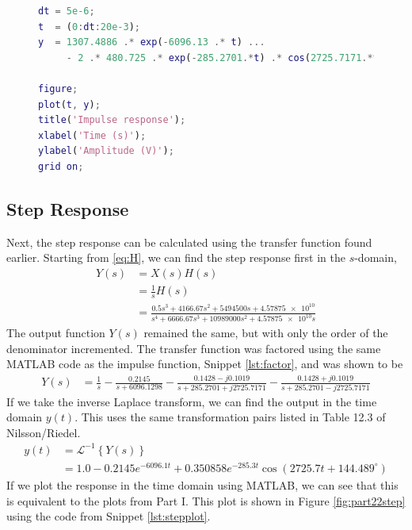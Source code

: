 \documentclass{homework}
\begin{document}
	\vspace{-2em}
	\begin{figure}[H]
		\begin{lstlisting}[language=matlab, caption={MATLAB code for plotting the impulse response.},label={lst:impulseplot}]
dt = 5e-6;
t  = (0:dt:20e-3);
y  = 1307.4886 .* exp(-6096.13 .* t) ...
     - 2 .* 480.725 .* exp(-285.2701.*t) .* cos(2725.7171.*t + deg2rad(60.45));

figure;
plot(t, y);
title('Impulse response');
xlabel('Time (s)');
ylabel('Amplitude (V)');
grid on;
		\end{lstlisting}		
	\end{figure}
	\pagebreak
	\subsection{Step Response}
	Next, the step response can be calculated using the transfer function found earlier. Starting from \eqref{eq:H}, we can find the step response first in the $s$-domain, \begin{align*}
		Y(s) & = X(s) H(s) \\
			& = \frac{1}{s} H(s) \\
			& = \frac{ 0.5 s^3 + 4166.67 s^2 + 5494500 s + \num{4.57875e10} }{s^4 + 6666.67 s^3 + 10989000 s^2 + \num{4.57875e10}s}
	\end{align*}
	The output function $Y(s)$ remained the same, but with only the order of the denominator incremented. The transfer function was factored using the same MATLAB code as the impulse function, Snippet \ref{lst:factor}, and was shown to be \begin{align*}
		Y(s) & =  \frac{1}{s} - \frac{0.2145}{s + 6096.1298}
			- \frac{0.1428 - j0.1019}{s + 285.2701 + j2725.7171}
			- \frac{0.1428 + j0.1019}{s + 285.2701 - j2725.7171}
	\end{align*}
	If we take the inverse Laplace transform, we can find the output in the time domain $y(t)$. This uses the same transformation pairs listed in Table 12.3 of Nilsson/Riedel. 
	\begin{align*}
		y(t) & = \mathcal{L}^{-1} \left\{ Y(s) \right\} \\
			& = 1.0 - 0.2145 e^{-6096.1 t} + 0.350858 e^{-285.3 t} \cos(2725.7 t + 144.489^\circ)
	\end{align*}
	If we plot the response in the time domain using MATLAB, we can see that this is equivalent to the plots from Part I. This plot is shown in Figure \ref{fig:part22step} using the code from Snippet \ref{lst:stepplot}.
\end{document}
